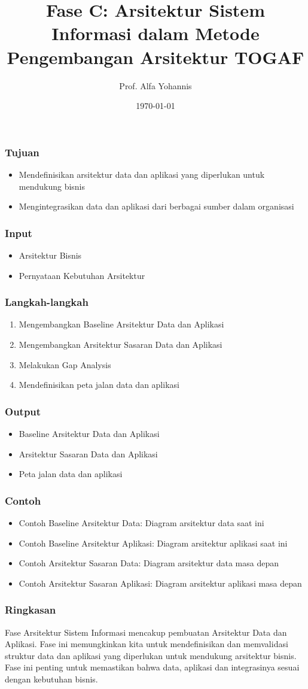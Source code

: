 \documentclass{beamer}
\title{Fase C: Arsitektur Sistem Informasi dalam Metode Pengembangan Arsitektur TOGAF}
\author{Prof. Alfa Yohannis}
\date{\today}
\begin{document}
\frame{\titlepage}

\begin{frame}
\frametitle{Tujuan}
\begin{itemize}
\item Mendefinisikan arsitektur data dan aplikasi yang diperlukan untuk mendukung bisnis
\item Mengintegrasikan data dan aplikasi dari berbagai sumber dalam organisasi
\end{itemize}
\end{frame}

\begin{frame}
\frametitle{Input}
\begin{itemize}
\item Arsitektur Bisnis
\item Pernyataan Kebutuhan Arsitektur
\end{itemize}
\end{frame}

\begin{frame}
\frametitle{Langkah-langkah}
\begin{enumerate}
\item Mengembangkan Baseline Arsitektur Data dan Aplikasi
\item Mengembangkan Arsitektur Sasaran Data dan Aplikasi
\item Melakukan Gap Analysis
\item Mendefinisikan peta jalan data dan aplikasi
\end{enumerate}
\end{frame}

\begin{frame}
\frametitle{Output}
\begin{itemize}
\item Baseline Arsitektur Data dan Aplikasi
\item Arsitektur Sasaran Data dan Aplikasi
\item Peta jalan data dan aplikasi
\end{itemize}
\end{frame}

\begin{frame}
\frametitle{Contoh}
\begin{itemize}
\item Contoh Baseline Arsitektur Data: Diagram arsitektur data saat ini
\item Contoh Baseline Arsitektur Aplikasi: Diagram arsitektur aplikasi saat ini
\item Contoh Arsitektur Sasaran Data: Diagram arsitektur data masa depan
\item Contoh Arsitektur Sasaran Aplikasi: Diagram arsitektur aplikasi masa depan
\end{itemize}
\end{frame}

\begin{frame}
\frametitle{Ringkasan}
Fase Arsitektur Sistem Informasi mencakup pembuatan Arsitektur Data dan Aplikasi. Fase ini memungkinkan kita untuk mendefinisikan dan memvalidasi struktur data dan aplikasi yang diperlukan untuk mendukung arsitektur bisnis. Fase ini penting untuk memastikan bahwa data, aplikasi dan integrasinya sesuai dengan kebutuhan bisnis.
\end{frame}
\end{document}
